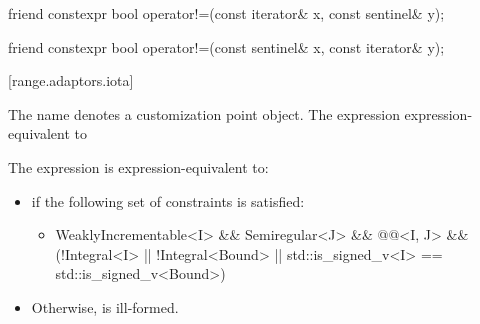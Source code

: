 \begin{itemdescr}
\pnum
\oldtxt{\returns} 
\end{itemdescr}

\begin{itemdecl}
friend constexpr bool operator!=(const iterator& x, const sentinel& y);
\end{itemdecl}

\begin{itemdescr}
\pnum
\oldtxt{\returns} 
\end{itemdescr}

\begin{itemdecl}
friend constexpr bool operator!=(const sentinel& x, const iterator& y);
\end{itemdecl}

\begin{itemdescr}
\pnum
\oldtxt{\returns} 
\end{itemdescr}

[range.adaptors.iota]{}

\pnum
The name  denotes a customization point
object.
The expression    expression-equivalent to
 

{\color{oldclr}
\pnum
The expression  is expression-equivalent to:

\begin{itemize}
\item {} if the following set of constraints
is satisfied:
\begin{itemize}
\item \begin{codeblock}
WeaklyIncrementable<I> && Semiregular<J> &&
@@<I, J> &&
(!Integral<I> || !Integral<Bound> || std::is_signed_v<I> == std::is_signed_v<Bound>)
\end{codeblock}
\end{itemize}
\item Otherwise,  is ill-formed.
\end{itemize}
} %

